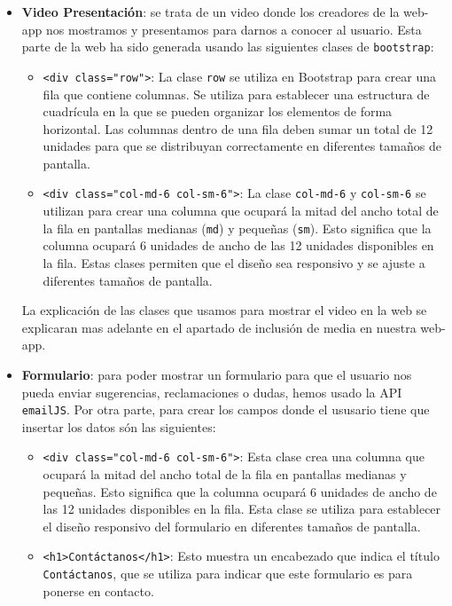 \documentclass{article}
\begin{document}
\begin{itemize}
    \item \textbf{Video Presentación}: se trata de un video donde los creadores de la web-app nos mostramos y presentamos para darnos a conocer al usuario. Esta parte de la web ha sido generada usando las siguientes clases de \texttt{bootstrap}:
    \begin{itemize}
        \item \texttt{<div class="row">}: La clase \texttt{row} se utiliza en Bootstrap para crear una fila que contiene columnas. Se utiliza para establecer una estructura de cuadrícula en la que se pueden organizar los elementos de forma horizontal. Las columnas dentro de una fila deben sumar un total de 12 unidades para que se distribuyan correctamente en diferentes tamaños de pantalla.

        \item \texttt{<div class="col-md-6 col-sm-6">}: La clase \texttt{col-md-6} y \texttt{col-sm-6} se utilizan para crear una columna que ocupará la mitad del ancho total de la fila en pantallas medianas (\texttt{md}) y pequeñas (\texttt{sm}). Esto significa que la columna ocupará 6 unidades de ancho de las 12 unidades disponibles en la fila. Estas clases permiten que el diseño sea responsivo y se ajuste a diferentes tamaños de pantalla.
    \end{itemize}
    La explicación de las clases que usamos para mostrar el video en la web se explicaran mas adelante en el apartado de inclusión de media en nuestra web-app.
    \item \textbf{Formulario}: para poder mostrar un formulario para que el usuario nos pueda enviar sugerencias, reclamaciones o dudas, hemos usado la API \texttt{emailJS}. Por otra parte, para crear los campos donde el ususario tiene que insertar los datos són las siguientes:
    \begin{itemize}
        \item  \texttt{<div class="col-md-6 col-sm-6">}: Esta clase crea una columna que ocupará la mitad del ancho total de la fila en pantallas medianas y pequeñas. Esto significa que la columna ocupará 6 unidades de ancho de las 12 unidades disponibles en la fila. Esta clase se utiliza para establecer el diseño responsivo del formulario en diferentes tamaños de pantalla.

        \item  \texttt{<h1>Contáctanos</h1>}: Esto muestra un encabezado que indica el título \texttt{Contáctanos}, que se utiliza para indicar que este formulario es para ponerse en contacto.


\end{itemize}
\end{itemize}
\end{document}
